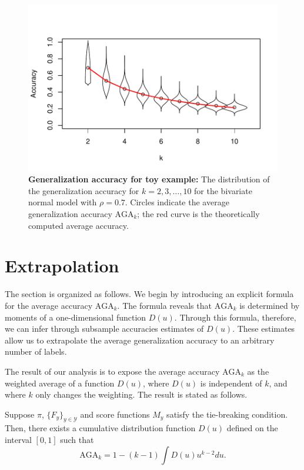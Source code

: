\documentclass[twoside,11pt]{article}
\begin{document}
\begin{figure}[h]
\centering
\includegraphics[scale = 0.7, clip = true, trim = 0 0 0 0.5in]{illus_err_0_7.pdf}

\caption{\textbf{Generalization accuracy for toy example:} The distribution of the generalization accuracy
  for $k = 2,3,\hdots, 10$ for the bivariate normal model with $\rho =
  0.7$.  Circles indicate the average generalization accuracy $\text{AGA}_k$; the red
  curve is the theoretically computed average accuracy.}\label{fig:toy2}
\end{figure}
\section{Extrapolation}
\label{sec:extrapolation}

The section is organized as follows.  We begin by introducing an
explicit formula for the average accuracy $\text{AGA}_{k}$.  The
formula reveals that $\text{AGA}_{k}$ is determined by moments of a
one-dimensional function ${D}(u)$.  Through this formula,
therefore, we can infer through subsample accuracies estimates of
${D}(u)$.  These estimates allow us to extrapolate the average
generalization accuracy to an arbitrary number of labels.

The result of our analysis is to expose the average accuracy
$\text{AGA}_{k}$ as the weighted average of a function ${D}(u)$,
where ${D}(u)$ is independent of $k$, and where $k$ only changes
the weighting.  The result is stated as follows.

\begin{theorem}\label{theorem:avrisk_identity}
Suppose $\pi$, $\{F_y\}_{y \in \mathcal{Y}}$ and score functions $M_y$
satisfy the tie-breaking condition.  Then, there exists a cumulative
distribution function ${D}(u)$ defined on the interval $[0,1]$
such that
\begin{equation}\label{eq:avrisk_identity}
\text{AGA}_{k} = 1 - (k-1) \int {D}(u) u^{k-2} du.
\end{equation}
\end{theorem}
\end{document}
